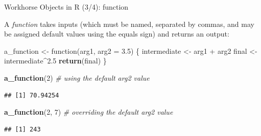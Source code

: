 \documentclass[10pt,ignorenonframetext,]{beamer}
\newenvironment{Shaded}{\begin{snugshade}}{\end{snugshade}}
\newcommand{\KeywordTok}[1]{\textcolor[rgb]{0.13,0.29,0.53}{\textbf{{#1}}}}
\newcommand{\DataTypeTok}[1]{\textcolor[rgb]{0.13,0.29,0.53}{{#1}}}
\newcommand{\DecValTok}[1]{\textcolor[rgb]{0.00,0.00,0.81}{{#1}}}
\newcommand{\FloatTok}[1]{\textcolor[rgb]{0.00,0.00,0.81}{{#1}}}
\newcommand{\StringTok}[1]{\textcolor[rgb]{0.31,0.60,0.02}{{#1}}}
\newcommand{\CommentTok}[1]{\textcolor[rgb]{0.56,0.35,0.01}{\textit{{#1}}}}
\newcommand{\NormalTok}[1]{{#1}}
\begin{document}
\begin{frame}[fragile]{Workhorse Objects in R (3/4): function}

A \emph{function} takes inputs (which must be named, separated by
commas, and may be assigned default values using the equals sign) and
returns an output:

\footnotesize

\begin{Shaded}
\begin{Highlighting}[]
\NormalTok{a_function <-}\StringTok{ }\NormalTok{function(arg1, }\DataTypeTok{arg2 =} \FloatTok{3.5}\NormalTok{) \{}
  \NormalTok{intermediate <-}\StringTok{ }\NormalTok{arg1 +}\StringTok{ }\NormalTok{arg2}
  \NormalTok{final <-}\StringTok{ }\NormalTok{intermediate^}\FloatTok{2.5}
  \KeywordTok{return}\NormalTok{(final)}
\NormalTok{\}}

\KeywordTok{a_function}\NormalTok{(}\DecValTok{2}\NormalTok{) }\CommentTok{# using the default arg2 value}
\end{Highlighting}
\end{Shaded}

\begin{verbatim}
## [1] 70.94254
\end{verbatim}

\begin{Shaded}
\begin{Highlighting}[]
\KeywordTok{a_function}\NormalTok{(}\DecValTok{2}\NormalTok{, }\DecValTok{7}\NormalTok{) }\CommentTok{# overriding the default arg2 value}
\end{Highlighting}
\end{Shaded}

\begin{verbatim}
## [1] 243
\end{verbatim}

\normalsize

\end{frame}
\end{document}
